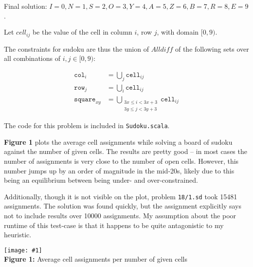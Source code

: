 \documentclass[12pt]{article}
\newcommand{\fig}[3]{
    \begin{center}
    \texttt{[image: \#1]} \\
    #2 \\
    \end{center}
}
\begin{document}
Final solution: $I = 0, N = 1, S = 2, O = 3, Y = 4, A = 5, Z = 6, B = 7, R = 8, E = 9$.


\problemsub

\problemsub

\problemasub

Let $\textit{cell}_{ij}$ be the value of the cell in column $i$, row $j$, with domain $[0, 9)$.

The constraints for sudoku are thus the union of $\textit{Alldiff}$ of the following sets over all combinations of
$i, j \in [0, 9)$:

\begin{align*}
    \texttt{col}_i &= \bigcup_j \texttt{cell}_{ij} \\
    \texttt{row}_j &= \bigcup_i \texttt{cell}_{ij} \\
    \texttt{square}_{xy} &= \bigcup_{\substack{3x \leq i < 3x+3 \\ 3y \leq j < 3y+3}}{\texttt{cell}_{ij}}
\end{align*}

\problemasub

The code for this problem is included in \texttt{Sudoku.scala}.

\problemasub

\textbf{Figure 1} plots the average cell assignments while solving a board of sudoku against the number of given cells.
The results are pretty good -- in most cases the number of assignments is very close to the number of open cells.
However, this number jumps up by an order of magnitude in the mid-20s, likely due to this being an equilibrium between
being under- and over-constrained.

Additionally, though it is not visible on the plot, problem \texttt{18/1.sd} took 15481 assignments. The solution was
found quickly, but the assignment explicitly says not to include results over 10000 assignments. My assumption about the
poor runtime of this test-case is that it happens to be quite antagonistic to my heuristic.

\fig{sudokuplot.png}{\textbf{Figure 1:} Average cell assignments per number of given cells}{0.5}
\end{document}
